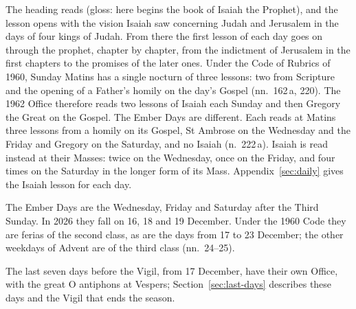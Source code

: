 \noindent The heading reads  (gloss: here begins the book
of Isaiah the Prophet), and the lesson opens with the vision Isaiah saw concerning Judah and
Jerusalem in the days of four kings of Judah.
From there the first lesson of each day goes on through the prophet, chapter by chapter, from the
indictment of Jerusalem in the first chapters to the promises of the later ones. Under the Code
of Rubrics of 1960, Sunday Matins has a single nocturn of three lessons: two from Scripture and
the opening of a Father's homily on the day's Gospel (nn.~162\,a, 220). The 1962 Office therefore
reads two lessons of Isaiah each Sunday and then Gregory the Great on the Gospel. The Ember Days
are different. Each reads at Matins three lessons from a homily on its Gospel, St Ambrose on the
Wednesday and the Friday and Gregory on the Saturday, and no Isaiah (n.~222\,a). Isaiah is read
instead at their Masses: twice on the Wednesday, once on the Friday, and four times on the
Saturday in the longer form of its Mass. Appendix~\ref{sec:daily}
gives the Isaiah lesson for each day.

The Ember Days are the Wednesday, Friday and Saturday after the Third Sunday. In 2026 they fall on
16, 18 and 19 December. Under the 1960 Code they are ferias of the second class, as are the days
from 17 to 23 December; the other weekdays of Advent are of the third class (nn.~24--25).

The last seven days before the Vigil, from 17 December, have their own Office, with the great O
antiphons at Vespers; Section~\ref{sec:last-days} describes these days and the Vigil that ends
the season.
